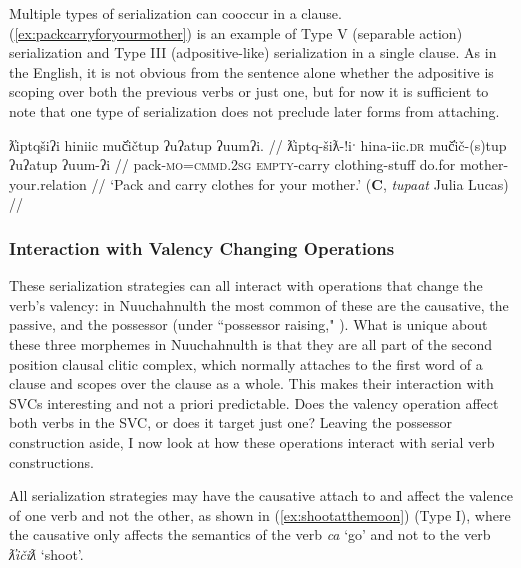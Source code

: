 {\begin{comment}
NB: This may be due to the !aƛ forcing a two-sentence interpretation
SB
m̓aw̓aaƛint ḥaaw̓iłƛisi huʔacap̓ƛ
m̓aw̓aaƛint huʔacap̓ƛ ḥaaw̓iłƛisi
*huʔacap̓ƛint m̓aw̓aaƛ ḥaaw̓iłƛisi 
\end{comment}

Multiple types of serialization can cooccur in a clause. (\ref{ex:packcarryforyourmother}) is an example of Type V (separable action) serialization and Type III (adpositive-like) serialization in a single clause. As in the English, it is not obvious from the sentence alone whether the adpositive is scoping over both the previous verbs or just one, but for now it is sufficient to note that one type of serialization does not preclude later forms from attaching.

\ex \label{ex:packcarryforyourmother}
\begingl
\glpreamble ƛ̓iptqšiʔi hiniic muč̓ičtup ʔuʔatup ʔuumʔi. //
\gla ƛ̓iptq-šiƛ-!iˑ hina-iic.\textsc{dr} muč̓ič-(s)tup ʔuʔatup ʔuum-ʔi //
\glb pack-\textsc{mo}=\textsc{cmmd.2sg} \textsc{empty}-carry clothing-stuff do.for mother-your.relation //
\glft `Pack and carry clothes for your mother.' (\textbf{C}, \textit{tupaat} Julia Lucas) //
\endgl
\xe

\subsubsection{Interaction with Valency Changing Operations}

These serialization strategies can all interact with operations that change the verb's valency: in Nuuchahnulth the most common of these are the causative, the passive, and the possessor (under ``possessor raising," \citealt{braithwaite2003}). What is unique about these three morphemes in Nuuchahnulth is that they are all part of the second position clausal clitic complex, which normally attaches to the first word of a clause and scopes over the clause as a whole. This makes their interaction with SVCs interesting and not a priori predictable. Does the valency operation affect both verbs in the SVC, or does it target just one? Leaving the possessor construction aside, I now look at how these operations interact with serial verb constructions.

All serialization strategies may have the causative attach to and affect the valence of one verb and not the other, as shown in (\ref{ex:shootatthemoon}) (Type I), where the causative only affects the semantics of the verb \textit{ca} `go' and not to the verb \textit{ƛ̓ičiƛ} `shoot'.

}
